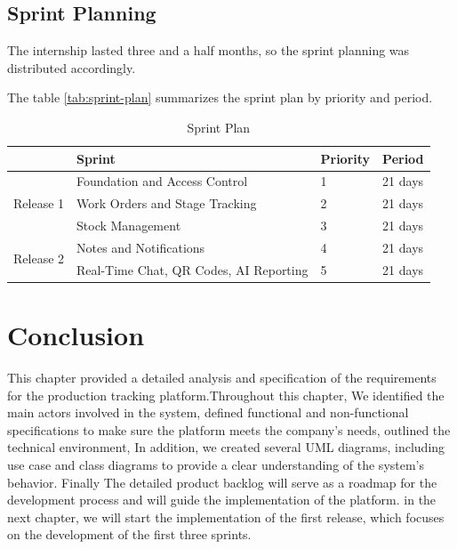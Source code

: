 \subsection{Sprint Planning}

The internship lasted three and a half months, so the sprint planning was distributed accordingly.

The table \ref{tab:sprint-plan} summarizes the sprint plan by priority and period.

\begin{table}[H]
    \centering
    \caption{Sprint Plan} \label{tab:sprint-plan}
    \label{tab:sprint-planning}
    \begin{tabular}{|p{2.8cm}|p{4.6cm}|p{2.2cm}|p{2.6cm}|}
        \hline
         & \textbf{Sprint} & \textbf{Priority} & \textbf{Period} \\
        \hline
        \multirow{3}{*}{Release 1} & Foundation and Access Control & 1 & 21 days \\
        \cline{2-4}
         & Work Orders and Stage Tracking & 2 & 21 days \\
        \cline{2-4}
         & Stock Management & 3 & 21 days \\
        \hline
        \multirow{2}{*}{Release 2} & Notes and Notifications & 4 & 21 days \\
        \cline{2-4}
         & Real-Time Chat, QR Codes, AI Reporting & 5 & 21 days \\
        \hline
    \end{tabular}
\end{table}


\section{Conclusion}
\label{sec:conclusion-analysis}
This chapter provided a detailed analysis and specification of the requirements for the production tracking platform.Throughout this chapter, We identified the main actors involved in the system, 
defined functional and non-functional specifications to make sure the platform meets the company's needs,
outlined the technical environment,
In addition, we created several UML diagrams, including use case and class diagrams to provide a clear understanding of the system's behavior.
Finally The detailed product backlog will serve as a roadmap for the development process and will guide the implementation of the platform.
in the next chapter, we will start the implementation of the first release, which focuses on the development of the first three sprints.    
